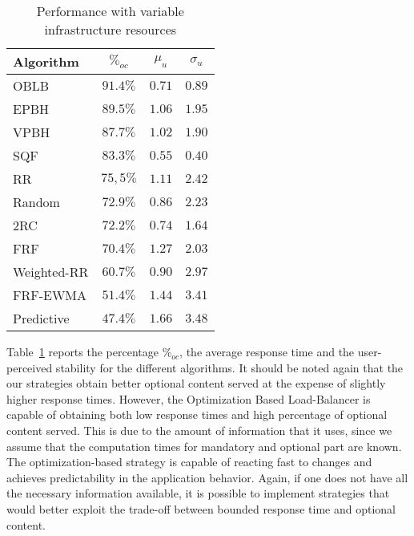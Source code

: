 \begin{table}
\centering
\caption{Performance with variable infrastructure resources}
\label{tab:resourcechanges-performance}
\begin{tabular}{l c c c}
\hline
Algorithm   & $\%_{oc}$ & $\mu_u$ & $\sigma_u$ \\
\hline
OBLB        & $\mathbf{91.4\%}$ & $0.71$          & $0.89$ \\
EPBH        & $89.5\%$          & $1.06$          & $1.95$ \\
VPBH        & $87.7\%$          & $1.02$          & $1.90$ \\
SQF         & $83.3\%$          & $\mathbf{0.55}$ & $\mathbf{0.40}$ \\
RR          & $75,5\%$          & $1.11$          & $2.42$ \\
Random      & $72.9\%$          & $0.86$          & $2.23$ \\
2RC         & $72.2\%$          & $0.74$          & $1.64$ \\
FRF         & $70.4\%$          & $1.27$          & $2.03$ \\
Weighted-RR & $60.7\%$          & $0.90$          & $2.97$ \\
FRF-EWMA    & $51.4\%$          & $1.44$          & $3.41$ \\
Predictive  & $47.4\%$          & $1.66$          & $3.48$ \\
\hline
\end{tabular}
\vspace{-4mm}
\end{table}

Table~\ref{tab:resourcechanges-performance} reports the percentage
$\%_{oc}$, the average response time and the user-perceived stability
for the different algorithms. It should be noted again that the
our strategies obtain better optional content served at the expense of
slightly higher response times. However, the Optimization Based
Load-Balancer is capable of obtaining both low response times and high
percentage of optional content served. This is due to the amount of
information that it uses, since we assume that the computation times
for mandatory and optional part are known. The optimization-based
strategy is capable of reacting fast to changes and achieves
predictability in the application behavior. Again, if one does not
have all the necessary information available, it is possible to
implement strategies that would better exploit the trade-off between
bounded response time and optional content.
